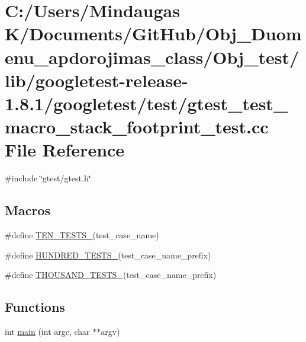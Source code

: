 \hypertarget{_obj__test_2lib_2googletest-release-1_88_81_2googletest_2test_2gtest__test__macro__stack__footprint__test_8cc}{}\section{C\+:/\+Users/\+Mindaugas K/\+Documents/\+Git\+Hub/\+Obj\+\_\+\+Duomenu\+\_\+apdorojimas\+\_\+class/\+Obj\+\_\+test/lib/googletest-\/release-\/1.8.1/googletest/test/gtest\+\_\+test\+\_\+macro\+\_\+stack\+\_\+footprint\+\_\+test.cc File Reference}
\label{_obj__test_2lib_2googletest-release-1_88_81_2googletest_2test_2gtest__test__macro__stack__footprint__test_8cc}
{\ttfamily \#include \char`\"{}gtest/gtest.\+h\char`\"{}}\newline
\subsection*{Macros}
\begin{DoxyCompactItemize}
\item 
\#define \mbox{\hyperlink{_obj__test_2lib_2googletest-release-1_88_81_2googletest_2test_2gtest__test__macro__stack__footprint__test_8cc_a5ec4fbf93965ff2608810fa9fa15d824}{T\+E\+N\+\_\+\+T\+E\+S\+T\+S\+\_\+}}(test\+\_\+case\+\_\+name)
\item 
\#define \mbox{\hyperlink{_obj__test_2lib_2googletest-release-1_88_81_2googletest_2test_2gtest__test__macro__stack__footprint__test_8cc_a27c403ca1878ce98fe3268318abee273}{H\+U\+N\+D\+R\+E\+D\+\_\+\+T\+E\+S\+T\+S\+\_\+}}(test\+\_\+case\+\_\+name\+\_\+prefix)
\item 
\#define \mbox{\hyperlink{_obj__test_2lib_2googletest-release-1_88_81_2googletest_2test_2gtest__test__macro__stack__footprint__test_8cc_a9671fd1d134f54e8295001098cff7810}{T\+H\+O\+U\+S\+A\+N\+D\+\_\+\+T\+E\+S\+T\+S\+\_\+}}(test\+\_\+case\+\_\+name\+\_\+prefix)
\end{DoxyCompactItemize}
\subsection*{Functions}
\begin{DoxyCompactItemize}
\item 
int \mbox{\hyperlink{_obj__test_2lib_2googletest-release-1_88_81_2googletest_2test_2gtest__test__macro__stack__footprint__test_8cc_a3c04138a5bfe5d72780bb7e82a18e627}{main}} (int argc, char $\ast$$\ast$argv)
\end{DoxyCompactItemize}


